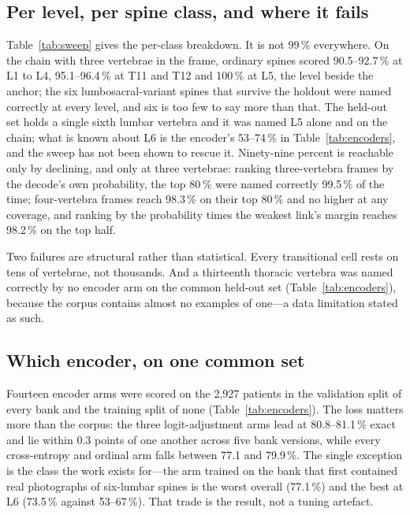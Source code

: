 \documentclass[11pt,letterpaper]{article}
\begin{document}
\subsection*{Per level, per spine class, and where it fails}
Table~\ref{tab:sweep} gives the per-class breakdown. It is not 99\,\% everywhere. On the chain with three vertebrae in
the frame, ordinary spines scored 90.5--92.7\,\% at L1 to L4, 95.1--96.4\,\% at T11 and T12 and 100\,\% at
L5, the level beside the anchor; the six lumbosacral-variant spines that survive the holdout were named
correctly at every level, and six is too few to say more than that. The held-out set holds a single sixth
lumbar vertebra and it was named L5 alone and on the chain; what is known about L6 is the encoder's
53--74\,\% in Table~\ref{tab:encoders}, and the sweep has not been shown to rescue it. Ninety-nine percent is reachable only
by declining, and only at three vertebrae: ranking three-vertebra frames by the decode's own probability,
the top 80\,\% were named correctly 99.5\,\% of the time; four-vertebra frames reach 98.3\,\% on their top
80\,\% and no higher at any coverage, and ranking by the probability times the weakest link's margin
reaches 98.2\,\% on the top half.

Two failures are structural rather than statistical. Every transitional cell rests on tens of vertebrae, not
thousands. And a thirteenth thoracic vertebra was named correctly by no encoder arm on the common held-out
set (Table~\ref{tab:encoders}), because the corpus contains almost no examples of one---a data limitation stated as such.

\subsection*{Which encoder, on one common set}
Fourteen encoder arms were scored on the 2,927 patients in the validation split of every bank and the
training split of none (Table~\ref{tab:encoders}). The loss matters more than the corpus: the three logit-adjustment arms
lead at 80.8--81.1\,\% exact and lie within 0.3 points of one another across five bank versions, while every
cross-entropy and ordinal arm falls between 77.1 and 79.9\,\%. The single exception is the class the work
exists for---the arm trained on the bank that first contained real photographs of six-lumbar spines is the
worst overall (77.1\,\%) and the best at L6 (73.5\,\% against 53--67\,\%). That trade is the result, not a
tuning artefact.
\end{document}
